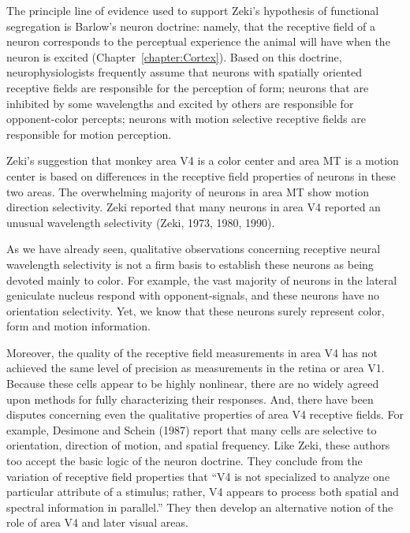 The principle line of evidence used to support Zeki's hypothesis of
functional segregation is Barlow's neuron doctrine: namely, that the
receptive field of a neuron corresponds to the perceptual experience
the animal will have when the neuron is excited
(Chapter~\ref{chapter:Cortex}).  Based on this doctrine,
neurophysiologists frequently assume that neurons with spatially
oriented receptive fields are responsible for the perception of form;
neurons that are inhibited by some wavelengths and excited by others
are responsible for opponent-color percepts; neurons with motion
selective receptive fields are responsible for motion perception.

Zeki's suggestion that monkey area V4 is a color center and area MT is
a motion center is based on differences in the receptive field
properties of neurons in these two areas.  The overwhelming majority
of neurons in area MT show motion direction selectivity.  Zeki
reported that many neurons in area V4 reported an unusual wavelength
selectivity (Zeki, 1973, 1980, 1990).

As we have already seen, qualitative observations concerning receptive
neural wavelength selectivity is not a firm basis to establish these
neurons as being devoted mainly to color.  For example, the vast
majority of neurons in the lateral geniculate nucleus respond with
opponent-signals, and these neurons have no orientation selectivity.
Yet, we know that these neurons surely represent color, form and
motion information.

Moreover, the quality of the receptive field measurements in area V4
has not achieved the same level of precision as measurements in the
retina or area V1.  Because these cells appear to be highly nonlinear,
there are no widely agreed upon methods for fully characterizing their
responses.  And, there have been disputes concerning even the
qualitative properties of area V4 receptive fields.  For example,
Desimone and Schein (1987) report that many cells are selective to
orientation, direction of motion, and spatial frequency.  Like Zeki,
these authors too accept the basic logic of the neuron doctrine.  They
conclude from the variation of receptive field properties that ``V4 is
not specialized to analyze one particular attribute of a stimulus;
rather, V4 appears to process both spatial and spectral information in
parallel.''  They then develop an alternative notion of the role of
area V4 and later visual areas.
\nocite{Desimone1985}

